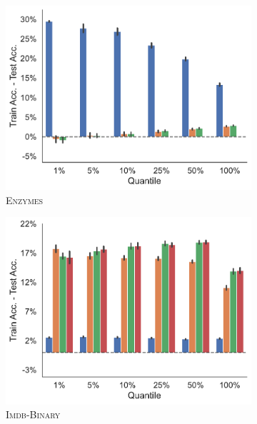 \begin{figure}[!htb]
	\begin{subfigure}[b]{0.3\textwidth}
		\centering
		\includegraphics[width=\textwidth]{Figures/train_test_diff_k_wl_ENZYMES.pdf}
		\vspace*{-4ex} 
		\caption{\textsc{Enzymes}}
	\end{subfigure}
	\hfill
	\begin{subfigure}[b]{0.3\textwidth}
		\centering
		\includegraphics[width=\textwidth]{Figures/train_test_diff_k_wl_IMDB-BINARY.pdf}
		\vspace*{-4ex} 
		\caption{\textsc{Imdb-Binary}}
	\end{subfigure}
	\hfill
	\begin{subfigure}[b]{0.3\textwidth}

\end{subfigure}
\end{figure}
